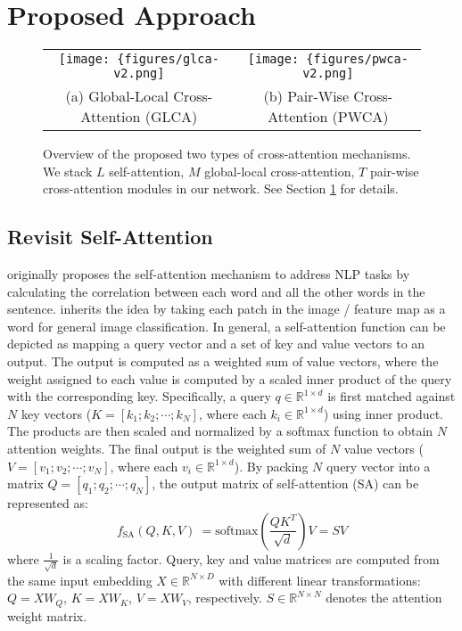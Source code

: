 \section{Proposed Approach}
\label{sec:method}

\begin{figure*}[t!]
\footnotesize
\begin{center}
\begin{tabular}{@{}cc@{}}
\texttt{[image: \{figures/glca-v2.png]}} & 
\texttt{[image: \{figures/pwca-v2.png]}} \\
{\footnotesize (a) Global-Local Cross-Attention (GLCA)} & 
{\footnotesize (b) Pair-Wise Cross-Attention (PWCA)}
\end{tabular}
\end{center}
\vspace{-5mm}
\caption{Overview of the proposed two types of cross-attention mechanisms. We stack $L$ self-attention, $M$ global-local cross-attention, $T$ pair-wise cross-attention modules in our network. See Section \ref{sec:method} for details.}
\label{figure:overview}
\end{figure*}

\subsection{Revisit Self-Attention}

\cite{vaswani2017attention} originally proposes the self-attention mechanism to address NLP tasks by calculating the correlation between each word and all the other words in the sentence. \cite{dosovitskiy2020image} inherits the idea by taking each patch in the image / feature map as a word for general image classification. In general, a self-attention function can be depicted as mapping a query vector and a set of key and value vectors to an output. The output is computed as a weighted sum of value vectors, where the weight assigned to each value is computed by a scaled inner product of the query with the corresponding key. Specifically, a query $q \in \mathbb{R}^{1\times d}$ is first matched against $N$ key vectors ($K=[k_1;k_2;\cdots ;k_N]$, where each $k_i \in \mathbb{R}^{1\times d}$) using inner product. The products are then scaled and normalized by a softmax function to obtain $N$ attention weights. The final output is the weighted sum of $N$ value vectors ($V=[v_1;v_2;\cdots ;v_N]$, where each $v_i \in \mathbb{R}^{1\times d}$). By packing $N$ query vector into a matrix $Q=[q_1;q_2;\cdots ;q_N]$, the output matrix of self-attention (SA) can be represented as:
\begin{equation}
    f_{\mbox{SA}}(Q,K,V)\ =\mbox{softmax}(\frac{QK^T}{\sqrt{d}})V = SV
\label{eq:sa}
\end{equation}
where $\frac{1}{\sqrt{d}}$ is a scaling factor.  Query, key and value matrices are computed from the same input embedding $X \in \mathbb{R}^{N\times D}$ with different linear transformations: $Q=XW_Q$, $K=XW_K$, $V = XW_V$, respectively. $S \in \mathbb{R}^{N\times N}$ denotes the attention weight matrix. 

